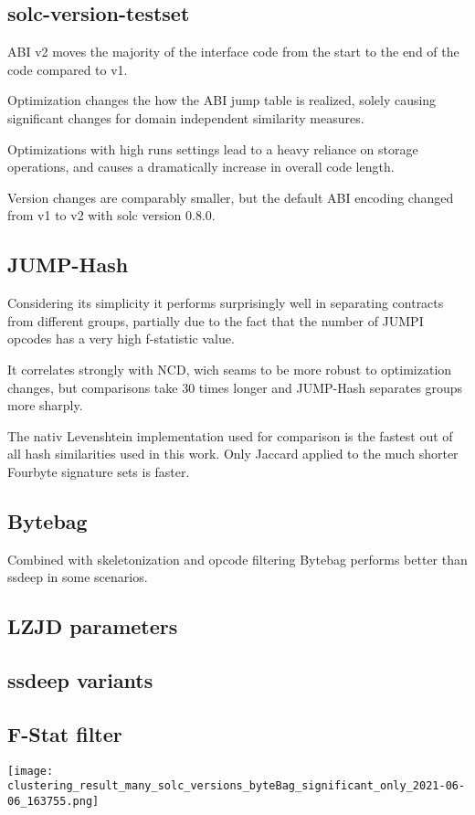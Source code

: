 \documentclass[../main.tex]{subfiles}
\begin{document}

\subsection{solc-version-testset}
ABI v2 moves the majority of the interface code from the start to the end of the code compared to v1.

Optimization changes the how the ABI jump table is realized, solely causing significant changes for domain independent similarity measures.

Optimizations with high runs settings lead to a heavy reliance on storage operations, and causes a dramatically increase in overall code length.

Version changes are comparably smaller, but the default ABI encoding changed from v1 to v2 with solc version 0.8.0.


\subsection{JUMP-Hash}
Considering its simplicity it performs surprisingly well in separating contracts from different groups, partially due to the fact that the number of JUMPI opcodes has a very high f-statistic value.

It correlates strongly with NCD, wich seams to be more robust to optimization changes, but comparisons take 30 times longer and JUMP-Hash separates groups more sharply.


The nativ Levenshtein implementation used for comparison is the fastest out of all hash similarities used in this work. Only Jaccard applied to the much shorter Fourbyte signature sets is faster.


\subsection{Bytebag}
Combined with skeletonization and opcode filtering Bytebag performs better than ssdeep in some scenarios.

\subsection{LZJD parameters}



\subsection{ssdeep variants}

\subsection{F-Stat filter}

\texttt{[image: clustering\_result\_many\_solc\_versions\_byteBag\_significant\_only\_2021-06-06\_163755.png]}
\end{document}
